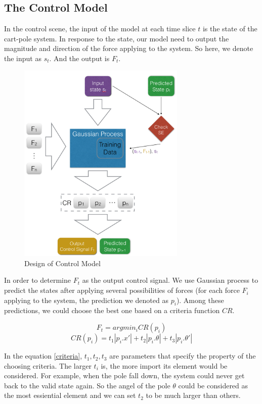 \documentclass[11pt,twoside,a4paper]{article}
\begin{document}
\subsection{The Control Model}
In the control scene, the input of the model at each time slice $t$ is the
state of the cart-pole system. In response to the state, our model
need to output the magnitude and direction of the force applying to
the system. So here, we denote the input as $s_t$. And the
output is $F_t$.\\
\begin{figure}[h!]
\begin{center}
\includegraphics[width=8cm]{control-model.png}
\caption{Design of Control Model}
\label{control-model}
\end{center}
\end{figure}

In order to determine $F_t$ as the output control signal. We
use Gaussian process to predict the states after applying several
possibilities of forces (for each force $F_i$ applying to the system,
the prediction we denoted as $p_i$). Among these predictions, we could
choose the best one based on a criteria function $CR$.
\begin{center}
\begin{equation}
F_t = argmin_i{CR(p_i)}
\end{equation}
\begin{equation} \label{criteria}
CR(p_i) = t_1 |p_i.x'| + t_2 |p_i.\theta| + t_3 |p_i.\theta'|
\end{equation}
\end{center}

In the equation \ref{criteria}, $t_1, t_2, t_3$ are parameters that
specify the property of the choosing criteria. The larger $t_i$ is,
the more import its element would be considered. For example, when the
pole fall down, the system could never get back to the valid state
again. So the angel of the pole $\theta$ could be considered as the most
essiential element and we can set $t_2$ to be much larger than others.\\
\end{document}
